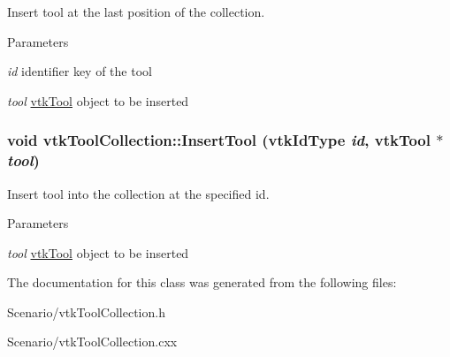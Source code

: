 Insert tool at the last position of the collection. 


\begin{DoxyParams}{Parameters}
\item[{\em id}]identifier key of the tool \item[{\em tool}]\hyperlink{classvtkTool}{vtkTool} object to be inserted \end{DoxyParams}
\hypertarget{classvtkToolCollection_a7bf8d8954ceaafb5c5985eac7d96eb18}{
\subsubsection[{InsertTool}]{\setlength{\rightskip}{0pt plus 5cm}void vtkToolCollection::InsertTool (vtkIdType {\em id}, \/  {\bf vtkTool} $\ast$ {\em tool})}}
\label{classvtkToolCollection_a7bf8d8954ceaafb5c5985eac7d96eb18}


Insert tool into the collection at the specified id. 


\begin{DoxyParams}{Parameters}
\item[{\em tool}]\hyperlink{classvtkTool}{vtkTool} object to be inserted \end{DoxyParams}


The documentation for this class was generated from the following files:\begin{DoxyCompactItemize}
\item 
Scenario/vtkToolCollection.h\item 
Scenario/vtkToolCollection.cxx\end{DoxyCompactItemize}
